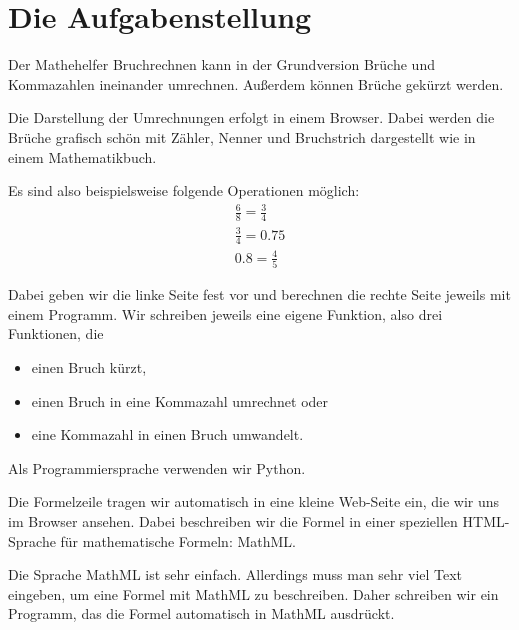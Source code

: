 \section{Die Aufgabenstellung}

Der Mathehelfer Bruchrechnen kann in der Grundversion Brüche und Kommazahlen ineinander umrechnen. Außerdem können Brüche gekürzt werden.

Die Darstellung der Umrechnungen erfolgt in einem Browser. Dabei werden die Brüche grafisch schön mit Zähler, Nenner und Bruchstrich dargestellt wie in einem Mathematikbuch.

Es sind also beispielsweise folgende Operationen möglich:
\begin{align*}
& \frac{6}{8} = \frac{3}{4} & \\[2ex]
& \frac{3}{4} = 0.75 & \\[2ex]
& 0.8 = \frac{4}{5} & 
\end{align*}


Dabei geben wir die linke Seite fest vor und berechnen die rechte Seite jeweils mit einem Programm. Wir schreiben jeweils eine eigene Funktion, also drei Funktionen, die

\begin{itemize}
	\item einen Bruch kürzt,
	\item einen Bruch in eine Kommazahl umrechnet oder 
	\item eine Kommazahl in einen Bruch umwandelt.
\end{itemize}

Als Programmiersprache verwenden wir Python.

Die Formelzeile tragen wir automatisch in eine kleine Web-Seite ein, die wir uns im Browser ansehen. Dabei beschreiben wir die Formel in einer speziellen HTML-Sprache für mathematische Formeln: MathML.

Die Sprache MathML ist sehr einfach. Allerdings muss man sehr viel Text eingeben, um eine Formel mit MathML zu beschreiben. Daher schreiben wir ein Programm, das die Formel automatisch in MathML ausdrückt.